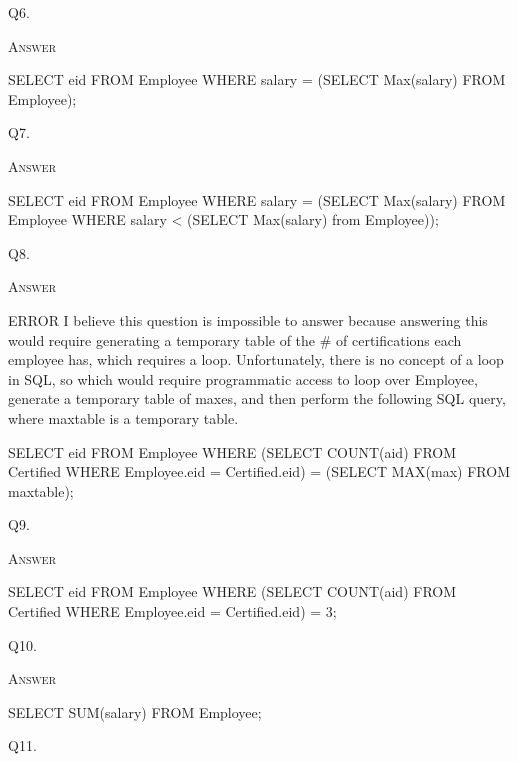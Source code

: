 Q6. 

\textsc{Answer}
\begin{answercode}
SELECT eid FROM Employee WHERE salary = (SELECT Max(salary)
FROM Employee);
\end{answercode}


\newpage

Q7. 

\textsc{Answer}
\begin{answercode}
SELECT eid FROM Employee WHERE salary = (SELECT Max(salary)
FROM Employee WHERE salary < (SELECT Max(salary) from Employee));
\end{answercode}




Q8. 

\textsc{Answer}
\begin{answercode}
ERROR
I believe this question is impossible to answer because answering this
would require generating a temporary table of the # of certifications
each employee has, which requires a loop. Unfortunately, there is no
concept of a loop in SQL, so which would require programmatic access
to loop over Employee, generate a temporary table of maxes, and then
perform the following SQL query, where maxtable is a temporary table.

SELECT eid FROM Employee WHERE (SELECT COUNT(aid) FROM Certified
WHERE Employee.eid = Certified.eid) = (SELECT MAX(max) FROM maxtable);
\end{answercode}


\newpage
Q9. 

\textsc{Answer}
\begin{answercode}
SELECT eid FROM Employee WHERE (SELECT COUNT(aid) FROM
Certified WHERE Employee.eid = Certified.eid) = 3;
\end{answercode}




Q10. 

\textsc{Answer}
\begin{answercode}
SELECT SUM(salary) FROM Employee;
\end{answercode}


\newpage
Q11. 

